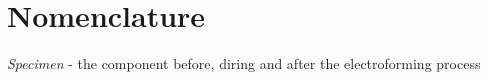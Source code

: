 \chapter{Nomenclature}

\textit{Specimen} - the component before, diring and after the electroforming process
\textit{}